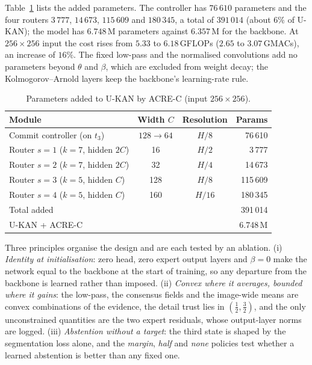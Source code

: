 Table~\ref{tab:params} lists the added parameters. The controller has $76\,610$ parameters and the four routers $3\,777$, $14\,673$, $115\,609$ and $180\,345$, a total of $391\,014$ (about $6\%$ of U-KAN); the model has $6.748$\,M parameters against $6.357$\,M for the backbone. At $256\times256$ input the cost rises from $5.33$ to $6.18$\,GFLOPs ($2.65$ to $3.07$\,GMACs), an increase of $16\%$.%
The fixed low-pass and the normalised convolutions add no parameters beyond $\theta$ and $\beta$, which are excluded from weight decay; the Kolmogorov--Arnold layers keep the backbone's learning-rate rule.

\begin{table}[!t]
\centering
\caption{Parameters added to U-KAN by ACRE-C (input $256\times256$).}
\label{tab:params}
\footnotesize
\begin{tabular}{@{}lccr@{}}
\toprule
Module & Width $C$ & Resolution & Params \\
\midrule
Commit controller (on $t_3$) & $128\to64$ & $H/8$ & 76\,610 \\
Router $s=1$ ($k=7$, hidden $2C$) & 16 & $H/2$ & 3\,777 \\
Router $s=2$ ($k=7$, hidden $2C$) & 32 & $H/4$ & 14\,673 \\
Router $s=3$ ($k=5$, hidden $C$) & 128 & $H/8$ & 115\,609 \\
Router $s=4$ ($k=5$, hidden $C$) & 160 & $H/16$ & 180\,345 \\
\midrule
Total added & & & 391\,014 \\
U-KAN + ACRE-C & & & 6.748\,M \\
\bottomrule
\end{tabular}
\end{table}

Three principles organise the design and are each tested by an ablation. (i) \emph{Identity at initialisation}: zero head, zero expert output layers and $\beta=0$ make the network equal to the backbone at the start of training, so any departure from the backbone is learned rather than imposed. (ii) \emph{Convex where it averages, bounded where it gains}: the low-pass, the consensus fields and the image-wide means are convex combinations of the evidence, the detail trust lies in $(\tfrac12,\tfrac32)$, and the only unconstrained quantities are the two expert residuals, whose output-layer norms are logged. (iii) \emph{Abstention without a target}: the third state is shaped by the segmentation loss alone, and the \emph{margin}, \emph{half} and \emph{none} policies test whether a learned abstention is better than any fixed one.
